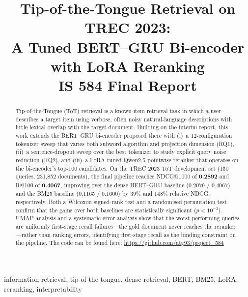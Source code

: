 \documentclass[conference]{IEEEtran}
\begin{document}
\title{Tip-of-the-Tongue Retrieval on TREC 2023:\\
       A Tuned BERT--GRU Bi-encoder with LoRA Reranking\\
       \large IS 584 Final Report}

\author{
}

\maketitle

\begin{abstract}
Tip-of-the-Tongue (ToT) retrieval is a known-item retrieval task in which
a user describes a target item using verbose, often noisy natural-language
descriptions with little lexical overlap with the target document.
Building on the interim report, this work extends the BERT--GRU bi-encoder
proposed there with (i)~a 12-configuration tokenizer sweep that varies
both subword algorithm and projection dimension (RQ1), (ii)~a sentence-dropout
sweep over the best tokenizer to study explicit query noise reduction (RQ2),
and (iii)~a LoRA-tuned Qwen2.5 pointwise reranker that operates on the
bi-encoder's top-100 candidates. On the TREC 2023 ToT development set
(150 queries, 231{,}852 documents), the final pipeline reaches NDCG@1000
of \textbf{0.2892} and R@100 of \textbf{0.4067}, improving over the
dense BERT--GRU baseline (0.2079 / 0.4067) and the BM25 baseline
(0.1165 / 0.1600) by 39\% and 148\% relative NDCG, respectively.
Both a Wilcoxon signed-rank test and a randomised permutation test confirm
that the gains over both baselines are statistically significant
($p < 10^{-3}$). UMAP analysis and a systematic error analysis show that the
worst-performing queries are uniformly first-stage recall failures---the gold
document never reaches the reranker---rather than ranking errors, identifying
first-stage recall as the binding constraint on the pipeline.
The code can be found here: \url{https://github.com/atg93/project_584}
\end{abstract}

\begin{IEEEkeywords}
information retrieval, tip-of-the-tongue, dense retrieval, BERT, BM25,
LoRA, reranking, interpretability
\end{IEEEkeywords}
\end{document}
